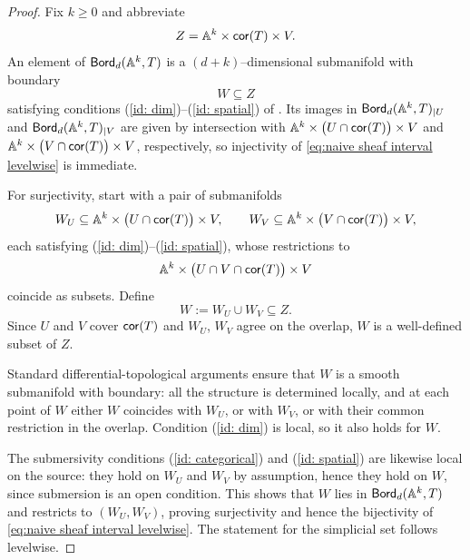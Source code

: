 \begin{proof}
Fix $k\geq 0$ and abbreviate
\begin{equation}
Z = \mathbb A^{k}\times \operatorname{{\sf cor}}(T)\times V.
\end{equation}
An element of $\operatorname{\mathsf{Bord}}_d(\mathbb A^{k},T)$ is a $(d+k)$–dimensional submanifold with boundary
\begin{equation}
W\subseteq Z
\end{equation}
satisfying conditions (\ref{id: dim})--(\ref{id: spatial}) of . Its images in
$\operatorname{\mathsf{Bord}}_d(\mathbb A^{k},T)_{|U}$ and $\operatorname{\mathsf{Bord}}_d(\mathbb A^{k},T)_{|V}$ are given by intersection with
$\mathbb A^{k}\times\big(U\cap \operatorname{{\sf cor}}(T)\big)\times V$ and
$\mathbb A^{k}\times\big(V\cap \operatorname{{\sf cor}}(T)\big)\times V$, respectively, so injectivity of
\eqref{eq:naive sheaf interval levelwise} is immediate.

For surjectivity, start with a pair of submanifolds
\begin{equation}
W_U\subseteq \mathbb A^{k}\times\big(U\cap\operatorname{{\sf cor}}(T)\big)\times V,\qquad
W_V\subseteq \mathbb A^{k}\times\big(V\cap\operatorname{{\sf cor}}(T)\big)\times V,
\end{equation}
each satisfying (\ref{id: dim})--(\ref{id: spatial}), whose restrictions to
\begin{equation}
\mathbb A^{k}\times\big(U\cap V\cap\operatorname{{\sf cor}}(T)\big)\times V
\end{equation}
coincide as subsets. Define
\begin{equation}
W := W_U \cup W_V \subseteq Z.
\end{equation}
Since $U$ and $V$ cover $\operatorname{{\sf cor}}(T)$ and $W_U$, $W_V$ agree on the overlap, $W$ is a well-defined subset of $Z$.

Standard differential-topological arguments ensure that $W$ is a smooth
submanifold with boundary: all the structure is determined locally, and at each point of $W$ either $W$ coincides with $W_U$, or with $W_V$, or with their common restriction in the overlap. Condition (\ref{id: dim}) is local, so it also holds for $W$.

The submersivity conditions (\ref{id: categorical}) and (\ref{id: spatial}) are likewise local on the source: they hold on $W_U$ and $W_V$ by assumption, hence they hold on $W$, since submersion is an open condition. This shows that $W$ lies in $\operatorname{\mathsf{Bord}}_d(\mathbb A^{k},T)$ and restricts to $(W_U,W_V)$, proving surjectivity and hence the bijectivity of \eqref{eq:naive sheaf interval levelwise}. The statement for the simplicial set follows levelwise.
\end{proof}

